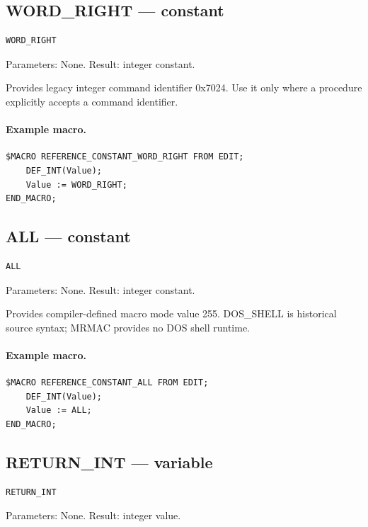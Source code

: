 \documentclass[a4paper,10pt,twoside,openany]{book}
\begin{document}
\label{prim:constant-word-right}
\subsection*{WORD\_RIGHT --- constant}
\begin{verbatim}
WORD_RIGHT
\end{verbatim}
Parameters: None. Result: integer constant.

Provides legacy integer command identifier 0x7024. Use it only where a procedure explicitly accepts a command identifier.

\paragraph{Example macro.}
\begin{verbatim}
$MACRO REFERENCE_CONSTANT_WORD_RIGHT FROM EDIT;
    DEF_INT(Value);
    Value := WORD_RIGHT;
END_MACRO;
\end{verbatim}

\label{prim:constant-all}
\subsection*{ALL --- constant}
\begin{verbatim}
ALL
\end{verbatim}
Parameters: None. Result: integer constant.

Provides compiler-defined macro mode value 255. DOS\_SHELL is historical source syntax; MRMAC provides no DOS shell runtime.

\paragraph{Example macro.}
\begin{verbatim}
$MACRO REFERENCE_CONSTANT_ALL FROM EDIT;
    DEF_INT(Value);
    Value := ALL;
END_MACRO;
\end{verbatim}

\label{prim:variable-return-int}
\subsection*{RETURN\_INT --- variable}
\begin{verbatim}
RETURN_INT
\end{verbatim}
Parameters: None. Result: integer value.
\end{document}
